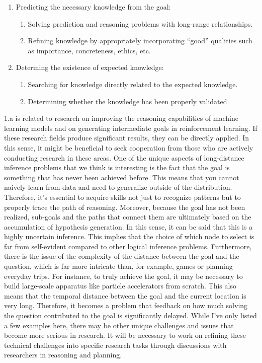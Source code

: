 \documentclass{book}
\begin{document}
\begin{enumerate}
    \item Predicting the necessary knowledge from the goal:
    \begin{enumerate}
        \item Solving prediction and reasoning problems with long-range relationships.
        \item Refining knowledge by appropriately incorporating ``good'' qualities such as importance, concreteness, ethics, etc.
    \end{enumerate}
    \item Determing the existence of expected knowledge:
    \begin{enumerate}
        \item Searching for knowledge directly related to the expected knowledge.
        \item Determining whether the knowledge has been properly validated.
    \end{enumerate}
\end{enumerate}

1.a is related to research on improving the reasoning capabilities of machine learning models and on generating intermediate goals in reinforcement learning. If these research fields produce significant results, they can be directly applied. In this sense, it might be beneficial to seek cooperation from those who are actively conducting research in these areas. One of the unique aspects of long-distance inference problems that we think is interesting is the fact that the goal is something that has never been achieved before. This means that you cannot naively learn from data and need to generalize outside of the distribution. Therefore, it's essential to acquire skills not just to recognize patterns but to properly trace the path of reasoning. Moreover, because the goal has not been realized, sub-goals and the paths that connect them are ultimately based on the accumulation of hypothesis generation. In this sense, it can be said that this is a highly uncertain inference. This implies that the choice of which node to select is far from self-evident compared to other logical inference problems. Furthermore, there is the issue of the complexity of the distance between the goal and the question, which is far more intricate than, for example, games or planning everyday trips. For instance, to truly achieve the goal, it may be necessary to build large-scale apparatus like particle accelerators from scratch. This also means that the temporal distance between the goal and the current location is very long. Therefore, it becomes a problem that feedback on how much solving the question contributed to the goal is significantly delayed. While I've only listed a few examples here, there may be other unique challenges and issues that become more serious in research. It will be necessary to work on refining these technical challenges into specific research tasks through discussions with researchers in reasoning and planning.
\end{document}
